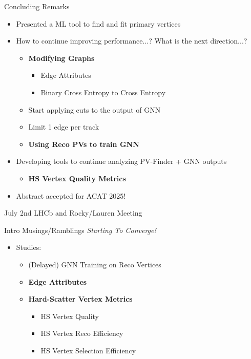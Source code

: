 \documentclass[xcolor=table,aspectratio=169]{beamer}
\begin{document}
\begin{frame}{Concluding Remarks}
    \begin{itemize}
        \item Presented a ML tool to find and fit primary vertices
        \item How to continue improving performance...? What is the next direction...?
        \begin{itemize}
            \item \textbf{Modifying Graphs}
            \begin{itemize}
                \item Edge Attributes
                \item Binary Cross Entropy to Cross Entropy
            \end{itemize}
            \item Start applying cuts to the output of GNN
            \item Limit 1 edge per track
            \item \textbf{Using Reco PVs to train GNN}
        \end{itemize}
        \item Developing tools to continue analyzing PV-Finder + GNN outputs
        \begin{itemize}
            \item \textbf{HS Vertex Quality Metrics}
        \end{itemize}
        \item Abstract accepted for ACAT 2025!
    \end{itemize}
\end{frame}

\begin{frame}[plain]
    \centering
    July 2nd LHCb and Rocky/Lauren Meeting
\end{frame}

\begin{frame}{Intro Musings/Ramblings}
    \centering
    \textit{Starting To Converge!}
    \begin{itemize}
        \item Studies:
        \begin{itemize}
            \item (Delayed) GNN Training on Reco Vertices
            \item \textbf{Edge Attributes}
            \item \textbf{Hard-Scatter Vertex Metrics}
            \begin{itemize}
                \item HS Vertex Quality
                \item HS Vertex Reco Efficiency
                \item HS Vertex Selection Efficiency
            \end{itemize}
        \end{itemize}
    \end{itemize}
\end{frame}
\end{document}
